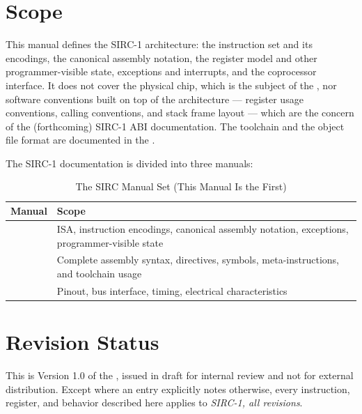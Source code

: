 \section*{Scope}

This manual defines the SIRC-1 architecture: the instruction set and its encodings, the canonical assembly notation,
the register model and other programmer-visible state, exceptions and interrupts, and the coprocessor interface. It
does not cover the physical chip, which is the subject of the \hwmanual{}, nor software conventions built on top of the
architecture --- register usage conventions, calling conventions, and stack frame layout --- which are the concern of
the (forthcoming) SIRC-1 ABI documentation. The toolchain and the object file format are documented in the
\asmmanual{}.

The SIRC-1 documentation is divided into three manuals:

\begin{table}[H]
	\centering
	\begin{tabular}{lp{8.6cm}}
		\toprule
		\textbf{Manual} & \textbf{Scope}                                                                                \\
		\midrule
		\archmanual{}   & ISA, instruction encodings, canonical assembly notation, exceptions, programmer-visible state \\
		\asmmanual{}    & Complete assembly syntax, directives, symbols, meta-instructions, and toolchain usage         \\
		\hwmanual{}     & Pinout, bus interface, timing, electrical characteristics                                     \\
		\bottomrule
	\end{tabular}
	\caption{The SIRC Manual Set (This Manual Is the First)}
	\label{tab:manual-set}
\end{table}

\section*{Revision Status}

This is Version 1.0 of the \archmanual{}, issued in draft for internal review and not for external distribution. Except
where an entry explicitly notes otherwise, every instruction, register, and behavior described here applies to
\textit{SIRC-1, all revisions}.
